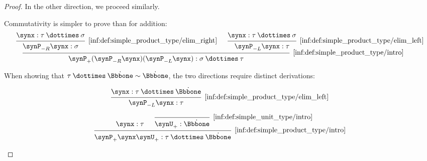 \begin{proof}
  In the other direction, we proceed similarly.

   Commutativity is simpler to prove than for addition:
  \begin{equation*}
    \begin{prooftree}
      \hypo{ \synx: \tau \syntimes \sigma }
      \infer1[\ref{inf:def:simple_product_type/elim_right}]{ \synP_{-R} \synx: \sigma }

      \hypo{ \synx: \tau \syntimes \sigma }
      \infer1[\ref{inf:def:simple_product_type/elim_left}]{ \synP_{-L} \synx: \tau }

      \infer2[\ref{inf:def:simple_product_type/intro}]{ \synP_+ (\synP_{-R} \synx) (\synP_{-L} \synx): \sigma \syntimes \tau }
    \end{prooftree}
  \end{equation*}

   When showing that \( \tau \syntimes \syn\Bbbone \sim \syn\Bbbone \), the two directions require distinct derivations:
  \begin{paracol}{2}
    \begin{leftcolumn}
      \ParacolAlignmentHack
      \begin{equation*}
        \begin{prooftree}
          \hypo{ \synx: \tau \syntimes \syn\Bbbone }
          \infer1[\ref{inf:def:simple_product_type/elim_left}]{ \synP_{-L} \synx: \tau }
        \end{prooftree}
      \end{equation*}
    \end{leftcolumn}

    \begin{rightcolumn}
      \ParacolAlignmentHack
      \begin{equation*}
        \begin{prooftree}
          \hypo{ \synx: \tau }

          \infer0[\ref{inf:def:simple_unit_type/intro}]{ \synU_+: \syn\Bbbone }

          \infer2[\ref{inf:def:simple_product_type/intro}]{ \synP_+ \synx \synU_+: \tau \syntimes \syn\Bbbone }
        \end{prooftree}
      \end{equation*}
    \end{rightcolumn}
  \end{paracol}


\end{proof}
